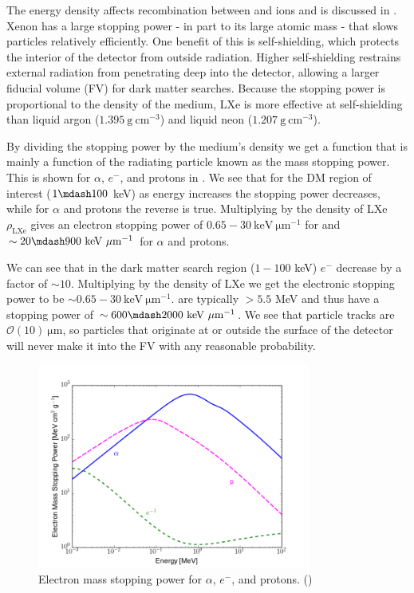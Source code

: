 The energy density affects recombination between \electron and ions and is discussed in .  Xenon
has a large stopping power - in part to its large atomic mass - that slows particles relatively efficiently.  One benefit of this
is self-shielding, which protects the interior of the detector from outside radiation.  Higher self-shielding restrains external
radiation from penetrating deep into the detector,
allowing a larger fiducial volume (FV) for dark matter searches.  Because the stopping power is proportional to the
density of the medium, LXe is more effective at self-shielding than liquid argon ($1.395\ \mathrm{g\ cm^{-3}}$) and liquid neon
($1.207\ \mathrm{g\ cm^{-3}}$).

By dividing the stopping power by the medium's density we get a function that is mainly a function of the radiating particle known as
the mass stopping power.  This is shown for $\alpha$, $e^{-}$, and protons in .  We see that for the DM
region of interest ($1 \mdash 100$ keV) as \electron
energy increases the stopping power decreases, while for $\alpha$ and protons the reverse is true.  Multiplying by the density of LXe
$\rho_{\mathrm{LXe}}$ gives an electron stopping power of $0.65-30\ \mathrm{keV\ \mu m^{-1}}$ for \electron and
$\sim 20 \mdash 900\ \mathrm{keV\ \mu m^{-1}}$ for $\alpha$ and protons.

We can see that in
the dark matter search region ($1-100$ keV) $e^{-}$ decrease by a factor of $\sim 10$.  Multiplying by the density of LXe we get the
electronic stopping power to be $\sim 0.65-30\ \mathrm{keV\ \mu m^{-1}}$.  \alphadecays are typically $> 5.5$ MeV and thus have a stopping
power of $\sim 600 \mdash 2000\ \mathrm{keV\ \mu m^{-1}}$.  We see that particle tracks are $\mathcal{O}(10)\ \mathrm{\mu m}$, so particles
that originate at or outside the surface of the detector will never make it into the FV with any reasonable probability.

\begin{figure}[t]
\includegraphics[width=0.8\textwidth]{MassStoppingPower}
\caption{Electron mass stopping power for $\alpha$, $e^{-}$, and protons.  ()}
\label{fig:mass_stopping_power}
\end{figure}

